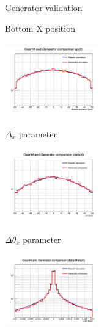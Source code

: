 \documentclass[8 pt]{beamer}
\begin{document}
\begin{frame}{Generator validation}

\vspace{-5pt}
\begin{minipage}[c]{.32\textwidth}
\begin{exampleblock}{} \begin{center}Bottom X position\end{center} \end{exampleblock}
\includegraphics[width=4.2cm, height=3.2cm]{figs/px2-17p2vs17p2.png} 
\end{minipage}
\begin{minipage}[c]{.32\textwidth}
\begin{exampleblock}{} \begin{center}$\Delta_x$ parameter\end{center} \end{exampleblock}
\includegraphics[width=4.2cm, height=3.2cm]{figs/deltaX-17p2vs17p2.png}
\end{minipage}
\begin{minipage}[c]{.32\textwidth}
\begin{exampleblock}{} \begin{center}$\Delta \theta_x$ parameter\end{center} \end{exampleblock}
\includegraphics[width=4.2cm, height=3.2cm]{figs/deltaThetaX-17p2vs17p2.png}
\end{minipage} \vspace{-8pt}


\end{frame}
\end{document}
